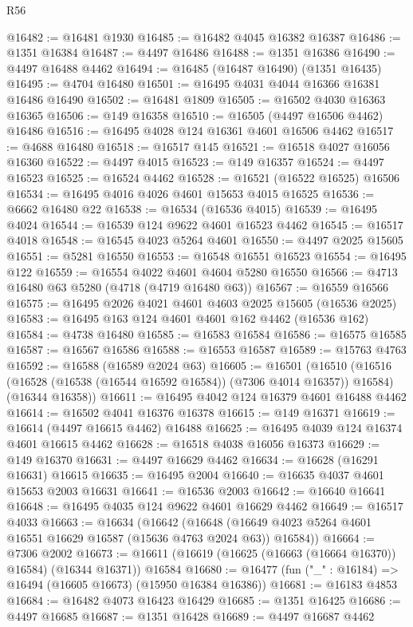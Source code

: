 \begin{lexlean}{R56}
\begin{coremodule}
@16482 := @16481 @1930
@16485 := @16482 @4045 @16382 @16387
@16486 := @1351 @16384
@16487 := @4497 @16486
@16488 := @1351 @16386
@16490 := @4497 @16488 @4462
@16494 := @16485 (@16487 @16490) (@1351 @16435)
@16495 := @4704 @16480
@16501 := @16495 @4031 @4044 @16366 @16381 @16486 @16490
@16502 := @16481 @1809
@16505 := @16502 @4030 @16363 @16365
@16506 := @149 @16358
@16510 := @16505 (@4497 @16506 @4462) @16486
@16516 := @16495 @4028 @124 @16361 @4601 @16506 @4462
@16517 := @4688 @16480
@16518 := @16517 @145
@16521 := @16518 @4027 @16056 @16360
@16522 := @4497 @4015
@16523 := @149 @16357
@16524 := @4497 @16523
@16525 := @16524 @4462
@16528 := @16521 (@16522 @16525) @16506
@16534 := @16495 @4016 @4026 @4601 @15653 @4015 @16525
@16536 := @6662 @16480 @22
@16538 := @16534 (@16536 @4015)
@16539 := @16495 @4024
@16544 := @16539 @124 @9622 @4601 @16523 @4462
@16545 := @16517 @4018
@16548 := @16545 @4023 @5264 @4601
@16550 := @4497 @2025 @15605
@16551 := @5281 @16550
@16553 := @16548 @16551 @16523
@16554 := @16495 @122
@16559 := @16554 @4022 @4601 @4604 @5280 @16550
@16566 := @4713 @16480 @63 @5280 (@4718 (@4719 @16480 @63))
@16567 := @16559 @16566
@16575 := @16495 @2026 @4021 @4601 @4603 @2025 @15605 (@16536 @2025)
@16583 := @16495 @163 @124 @4601 @4601 @162 @4462 (@16536 @162)
@16584 := @4738 @16480
@16585 := @16583 @16584
@16586 := @16575 @16585
@16587 := @16567 @16586
@16588 := @16553 @16587
@16589 := @15763 @4763
@16592 := @16588 (@16589 @2024 @63)
@16605 := @16501
    (@16510
      (@16516 (@16528 (@16538 (@16544 @16592 @16584)) (@7306 @4014 @16357)) @16584)
      (@16344 @16358))
@16611 := @16495 @4042 @124 @16379 @4601 @16488 @4462
@16614 := @16502 @4041 @16376 @16378
@16615 := @149 @16371
@16619 := @16614 (@4497 @16615 @4462) @16488
@16625 := @16495 @4039 @124 @16374 @4601 @16615 @4462
@16628 := @16518 @4038 @16056 @16373
@16629 := @149 @16370
@16631 := @4497 @16629 @4462
@16634 := @16628 (@16291 @16631) @16615
@16635 := @16495 @2004
@16640 := @16635 @4037 @4601 @15653 @2003 @16631
@16641 := @16536 @2003
@16642 := @16640 @16641
@16648 := @16495 @4035 @124 @9622 @4601 @16629 @4462
@16649 := @16517 @4033
@16663 := @16634
    (@16642
      (@16648 (@16649 @4023 @5264 @4601 @16551 @16629 @16587 (@15636 @4763 @2024 @63)) @16584))
@16664 := @7306 @2002
@16673 := @16611 (@16619 (@16625 (@16663 (@16664 @16370)) @16584) (@16344 @16371)) @16584
@16680 := @16477 (fun ("_" : @16184) => @16494 (@16605 @16673) (@15950 @16384 @16386))
@16681 := @16183 @4853
@16684 := @16482 @4073 @16423 @16429
@16685 := @1351 @16425
@16686 := @4497 @16685
@16687 := @1351 @16428
@16689 := @4497 @16687 @4462

\end{coremodule}
\end{lexlean}
